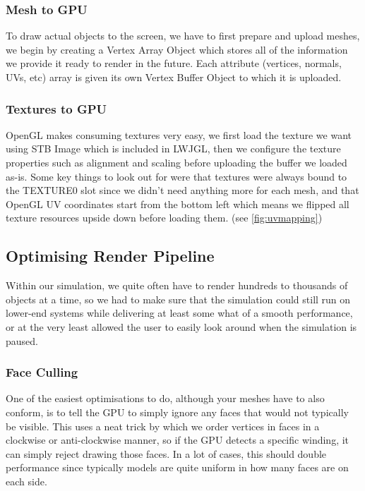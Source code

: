 \documentclass{article}
\begin{document}
\begin{multicols}{2}
                \subsubsection{Mesh to GPU}
            
                    To draw actual objects to the screen, we have to first prepare and upload meshes, we begin by creating a Vertex Array Object \cite{vao} which stores all of the information we provide it ready to render in the future. Each attribute (vertices, normals, UVs, etc) array is given its own Vertex Buffer Object \cite{vbo} to which it is uploaded.
                
                \subsubsection{Textures to GPU}
                
                    OpenGL makes consuming textures very easy, we first load the texture we want using STB Image \cite{stb} which is included in LWJGL, then we configure the texture properties such as alignment and scaling before uploading the buffer we loaded as-is. Some key things to look out for were that textures were always bound to the TEXTURE0 slot since we didn’t need anything more for each mesh, and that OpenGL UV coordinates start from the bottom left which means we flipped all texture resources upside down before loading them. (see \autoref{fig:uvmapping})
            
            \subsection{Optimising Render Pipeline}

                Within our simulation, we quite often have to render hundreds to thousands of objects at a time, so we had to make sure that the simulation could still run on lower-end systems while delivering at least some what of a smooth performance, or at the very least allowed the user to easily look around when the simulation is paused.

                \subsubsection{Face Culling}

                    One of the easiest optimisations to do, although your meshes have to also conform, is to tell the GPU to simply ignore any faces that would not typically be visible. This uses a neat trick by which we order vertices in faces in a clockwise or anti-clockwise manner, so if the GPU detects a specific winding, it can simply reject drawing those faces. In a lot of cases, this should double performance since typically models are quite uniform in how many faces are on each side.


\end{multicols}
\end{document}
